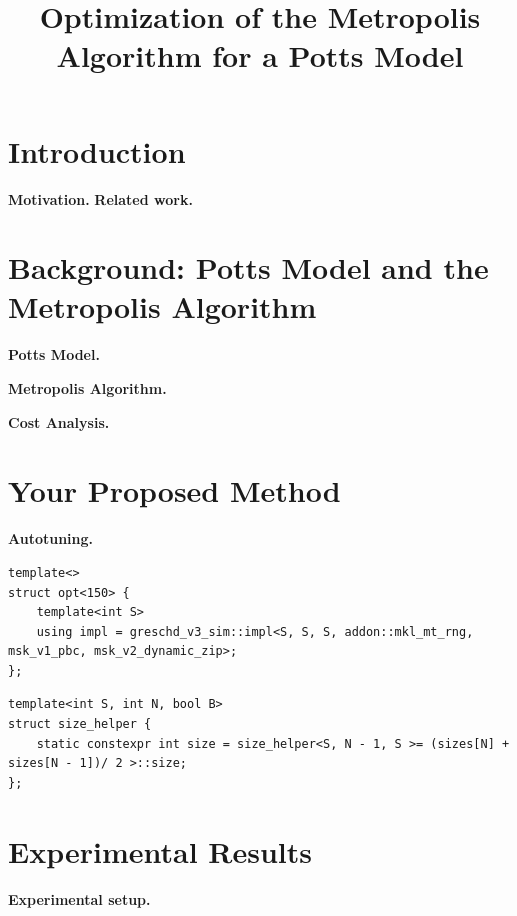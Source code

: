 \documentclass[letterpaper]{article}
\title{Optimization of the Metropolis Algorithm for a Potts Model}
\newcommand{\mypar}[1]{{\bf #1.}}
\begin{document}
%
\maketitle
%


\begin{abstract}
\end{abstract}

\section{Introduction}\label{sec:intro}

\mypar{Motivation} 
\mypar{Related work}

\section{Background: Potts Model and the Metropolis Algorithm}\label{sec:background}

\mypar{Potts Model}

\mypar{Metropolis Algorithm}

\mypar{Cost Analysis}


\section{Your Proposed Method}\label{sec:yourmethod}

\mypar{Autotuning}
\begin{lstlisting}
template<>
struct opt<150> {
    template<int S>
    using impl = greschd_v3_sim::impl<S, S, S, addon::mkl_mt_rng, msk_v1_pbc, msk_v2_dynamic_zip>; 
};

\end{lstlisting}

\begin{lstlisting}
template<int S, int N, bool B>
struct size_helper {
    static constexpr int size = size_helper<S, N - 1, S >= (sizes[N] + sizes[N - 1])/ 2 >::size;
};
\end{lstlisting}

\section{Experimental Results}\label{sec:exp}

\mypar{Experimental setup} 
\end{document}
